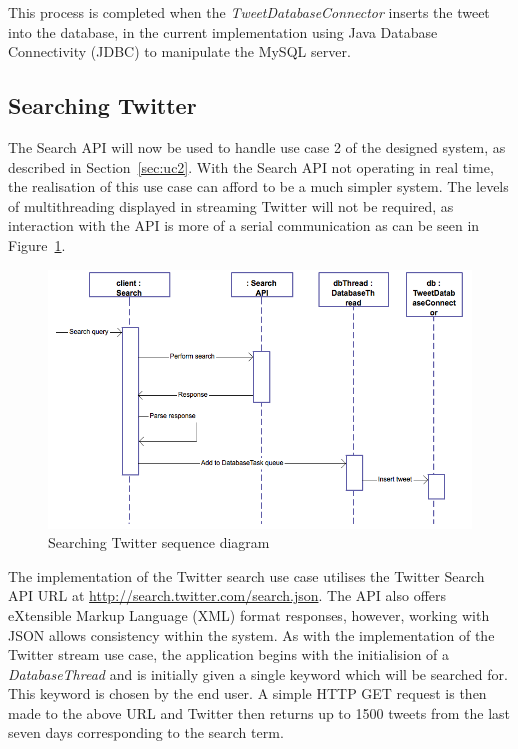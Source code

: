 This process is completed when the \emph{TweetDatabaseConnector} inserts the tweet into the database, in the current implementation using Java Database Connectivity (JDBC) to manipulate the MySQL server.

\subsection{Searching Twitter}
\label{sec:searchjava}
The Search API will now be used to handle use case 2 of the designed system, as described in Section~\ref{sec:uc2}. With the Search API not operating in real time, the realisation of this use case can afford to be a much simpler system. The levels of multithreading displayed in streaming Twitter will not be required, as interaction with the API is more of a serial communication as can be seen in Figure~\ref{fig:ucsearch}.

\begin{figure}[h]
\begin{center}
\includegraphics[width=13cm]{ucsearch}
\end{center}
\caption{Searching Twitter sequence diagram}
\label{fig:ucsearch}
\end{figure}

The implementation of the Twitter search use case utilises the Twitter Search API URL at \url{http://search.twitter.com/search.json}. The API also offers eXtensible Markup Language (XML) format responses, however, working with JSON allows consistency within the system. As with the implementation of the Twitter stream use case, the application begins with the initialision of a \emph{DatabaseThread} and is initially given a single keyword which will be searched for. This keyword is chosen by the end user. A simple HTTP GET request is then made to the above URL and Twitter then returns up to 1500 tweets from the last seven days corresponding to the search term.


